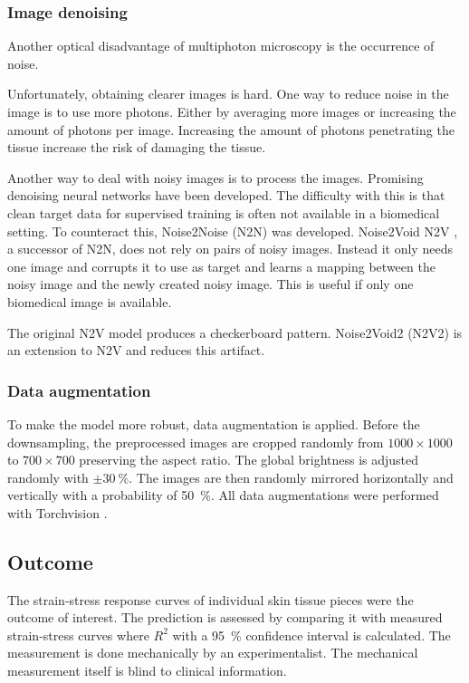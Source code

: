 \subsubsection{Image denoising}
Another optical disadvantage of multiphoton microscopy is the occurrence of noise.

Unfortunately, obtaining clearer images is hard.
One way to reduce noise in the image is to use more photons.
Either by averaging more images or increasing the amount of photons per image.
Increasing the amount of photons penetrating the tissue increase the risk of damaging the tissue.

Another way to deal with noisy images is to process the images.
Promising denoising neural networks have been developed.
The difficulty with this is that clean target data for supervised training is often not available in a biomedical setting.
To counteract this, Noise2Noise (N2N) \cite{Lehtinen2018} was developed.
Noise2Void N2V \cite{Krull2019}, a successor of N2N, does not rely on pairs of noisy images.
Instead it only needs one image and corrupts it to use as target and learns a mapping between the noisy image and the newly created noisy image.
This is useful if only one biomedical image is available.

The original N2V model produces a checkerboard pattern.
Noise2Void2 (N2V2) \cite{Hock2022} is an extension to N2V and reduces this artifact.

\subsubsection{Data augmentation}

To make the model more robust, data augmentation is applied.
Before the downsampling, the preprocessed images are cropped randomly from $1000\times1000$ to $700\times700$ preserving the aspect ratio.
The global brightness is adjusted randomly with $\pm \qty{30}{\percent}$.
The images are then randomly mirrored horizontally and vertically with a probability of \qty{50}{\percent}.
All data augmentations were performed with Torchvision \cite{torchvision2016}.

\subsection{Outcome}
The strain-stress response curves of individual skin tissue pieces were the outcome of interest.
The prediction is assessed by comparing it with measured strain-stress curves where $R^2$ with a \qty{95}{\percent} confidence interval is calculated.
The measurement is done mechanically by an experimentalist.
The mechanical measurement itself is blind to clinical information.

